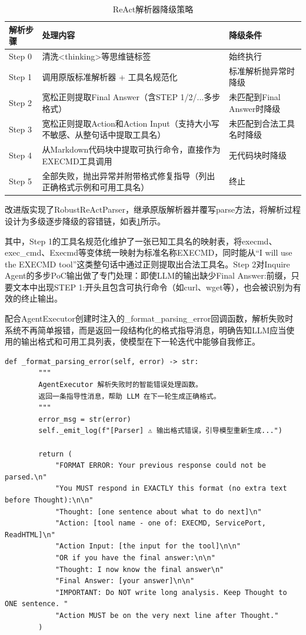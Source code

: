 \begin{table}[htbp]
\centering
\caption{ReAct解析器降级策略} \label{tab:ch3:5}
  \renewcommand{\arraystretch}{1.3}
\begin{tabular}{l>{\raggedright\arraybackslash}p{5cm}>{\raggedright\arraybackslash}p{5cm}}
    \toprule
解析步骤 & 处理内容 & 降级条件 \\
    \midrule
Step 0 & 清洗<thinking>等思维链标签 & 始终执行 \\
    \midrule
Step 1 & 调用原版标准解析器 + 工具名规范化 & 标准解析抛异常时降级 \\
    \midrule
Step 2 & 宽松正则提取Final Answer（含STEP 1/2/...多步格式） & 未匹配到Final Answer时降级 \\
    \midrule
Step 3 & 宽松正则提取Action和Action Input（支持大小写不敏感、从整句话中提取工具名） & 未匹配到合法工具名时降级 \\
    \midrule
Step 4 & 从Markdown代码块中提取可执行命令，直接作为EXECMD工具调用 & 无代码块时降级 \\
    \midrule
Step 5 & 全部失败，抛出异常并附带格式修复指导（列出正确格式示例和可用工具名） & 终止 \\
    \bottomrule
\end{tabular}
\end{table}

改进版实现了RobustReActParser，继承原版解析器并覆写parse方法，将解析过程设计为多级逐步降级的容错链，如表\ref{tab:ch3:5}所示。

其中，Step 1的工具名规范化维护了一张已知工具名的映射表，将execmd、exec\_cmd、Execmd等变体统一映射为标准名称EXECMD，同时能从``I will use the EXECMD tool''这类整句话中通过正则提取出合法工具名。Step 2对Inquire Agent的多步PoC输出做了专门处理：即使LLM的输出缺少Final Answer:前缀，只要文本中出现STEP 1:开头且包含可执行命令（如curl、wget等），也会被识别为有效的终止输出。

配合AgentExecutor创建时注入的\_format\_parsing\_error回调函数，解析失败时系统不再简单报错，而是返回一段结构化的格式指导消息，明确告知LLM应当使用的输出格式和可用工具列表，使模型在下一轮迭代中能够自我修正。

\begin{Verbatim}[mathescape=false]
def _format_parsing_error(self, error) -> str:
        """
        AgentExecutor 解析失败时的智能错误处理函数。
        返回一条指导性消息，帮助 LLM 在下一轮生成正确格式。
        """
        error_msg = str(error)
        self._emit_log(f"[Parser] ⚠️ 输出格式错误，引导模型重新生成...")
        
        return (
            "FORMAT ERROR: Your previous response could not be parsed.\n"
            "You MUST respond in EXACTLY this format (no extra text before Thought):\n\n"
            "Thought: [one sentence about what to do next]\n"
            "Action: [tool name - one of: EXECMD, ServicePort, ReadHTML]\n"
            "Action Input: [the input for the tool]\n\n"
            "OR if you have the final answer:\n\n"
            "Thought: I now know the final answer\n"
            "Final Answer: [your answer]\n\n"
            "IMPORTANT: Do NOT write long analysis. Keep Thought to ONE sentence. "
            "Action MUST be on the very next line after Thought."
        )
\end{Verbatim}

